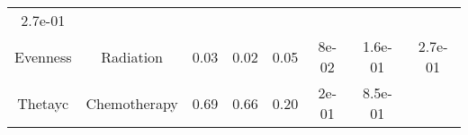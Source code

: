 \documentclass[12pt,]{article}
\begin{document}
\begin{longtable}[]{@{}cccccccc@{}}
\begin{minipage}[t]{0.08\columnwidth}
2.7e-01\strut
\end{minipage}\tabularnewline
\begin{minipage}[t]{0.12\columnwidth}\centering\strut
Evenness\strut
\end{minipage} & \begin{minipage}[t]{0.11\columnwidth}\centering\strut
Radiation\strut
\end{minipage} & \begin{minipage}[t]{0.13\columnwidth}\centering\strut
0.03\strut
\end{minipage} & \begin{minipage}[t]{0.08\columnwidth}\centering\strut
0.02\strut
\end{minipage} & \begin{minipage}[t]{0.13\columnwidth}\centering\strut
0.05\strut
\end{minipage} & \begin{minipage}[t]{0.07\columnwidth}\centering\strut
8e-02\strut
\end{minipage} & \begin{minipage}[t]{0.06\columnwidth}\centering\strut
1.6e-01\strut
\end{minipage} & \begin{minipage}[t]{0.08\columnwidth}\centering\strut
2.7e-01\strut
\end{minipage}\tabularnewline
\begin{minipage}[t]{0.12\columnwidth}\centering\strut
Thetayc\strut
\end{minipage} & \begin{minipage}[t]{0.11\columnwidth}\centering\strut
Chemotherapy\strut
\end{minipage} & \begin{minipage}[t]{0.13\columnwidth}\centering\strut
0.69\strut
\end{minipage} & \begin{minipage}[t]{0.08\columnwidth}\centering\strut
0.66\strut
\end{minipage} & \begin{minipage}[t]{0.13\columnwidth}\centering\strut
0.20\strut
\end{minipage} & \begin{minipage}[t]{0.07\columnwidth}\centering\strut
2e-01\strut
\end{minipage} & \begin{minipage}[t]{0.06\columnwidth}\centering\strut
8.5e-01\strut
\end{minipage} & \begin{minipage}[t]{0.08\columnwidth}\centering\strut

\end{minipage}
\end{longtable}
\end{document}
